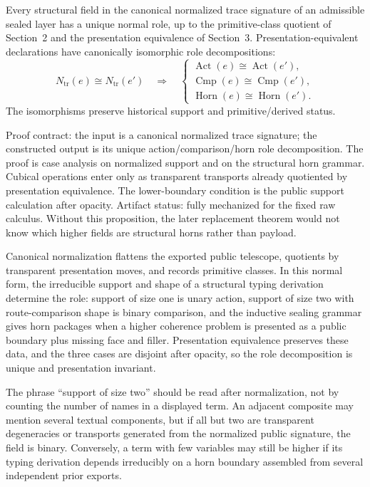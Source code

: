 \documentclass{lmcs}
\begin{document}
\begin{prop}
Every structural field in the canonical normalized trace signature of an admissible sealed
layer has a unique normal role, up to the primitive-class quotient of Section~2 and the
presentation equivalence of Section~3.  Presentation-equivalent declarations have canonically
isomorphic role decompositions:
\[
  N_{\mathrm{tr}}(e)
  \cong
  N_{\mathrm{tr}}(e')
  \quad\Longrightarrow\quad
  \begin{cases}
    \operatorname{Act}(e) \cong \operatorname{Act}(e'),\\
    \operatorname{Cmp}(e) \cong \operatorname{Cmp}(e'),\\
    \operatorname{Horn}(e) \cong \operatorname{Horn}(e').
  \end{cases}
\]
The isomorphisms preserve historical support and primitive/derived status.

Proof contract: the input is a canonical normalized trace signature; the
constructed output is its unique action/comparison/horn role decomposition.
The proof is case analysis on normalized support and on the structural horn
grammar.  Cubical operations enter only as transparent transports already
quotiented by presentation equivalence.  The lower-boundary condition is the
public support calculation after opacity.  Artifact status: fully mechanized
for the fixed raw calculus.  Without this proposition, the later replacement
theorem would not know which higher fields are structural horns rather than
payload.
\end{prop}

Canonical normalization flattens the exported public telescope, quotients by transparent
presentation moves, and records primitive classes.  In this normal form, the irreducible
support and shape of a structural typing derivation determine the role: support of size one is
unary action, support of size two with route-comparison shape is binary comparison, and the
inductive sealing grammar gives horn packages when a higher coherence problem is presented as
a public boundary plus missing face and filler.  Presentation equivalence preserves these data,
and the three cases are disjoint after opacity, so the role decomposition is unique and
presentation invariant.

\begin{rem}
The phrase ``support of size two'' should be read after normalization, not by counting the
number of names in a displayed term.  An adjacent composite may mention several textual
components, but if all but two are transparent degeneracies or transports generated from the
normalized public signature, the field is binary.  Conversely, a term with few variables may
still be higher if its typing derivation depends irreducibly on a horn boundary assembled from
several independent prior exports.
\end{rem}
\end{document}

